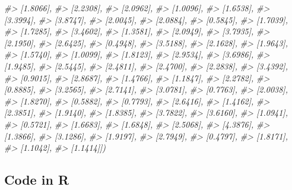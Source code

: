 \documentclass[]{book}
\newenvironment{Shaded}{\begin{snugshade}}{\end{snugshade}}
\newcommand{\CommentTok}[1]{\textcolor[rgb]{0.56,0.35,0.01}{\textit{#1}}}
\begin{document}
\begin{Shaded}
\begin{Highlighting}[]
\CommentTok{#>         [1.8066],}
\CommentTok{#>         [2.2308],}
\CommentTok{#>         [2.0962],}
\CommentTok{#>         [1.0096],}
\CommentTok{#>         [1.6538],}
\CommentTok{#>         [3.3994],}
\CommentTok{#>         [3.8747],}
\CommentTok{#>         [2.0045],}
\CommentTok{#>         [2.0884],}
\CommentTok{#>         [0.5845],}
\CommentTok{#>         [1.7039],}
\CommentTok{#>         [1.7285],}
\CommentTok{#>         [3.4602],}
\CommentTok{#>         [1.3581],}
\CommentTok{#>         [2.0949],}
\CommentTok{#>         [3.7935],}
\CommentTok{#>         [2.1950],}
\CommentTok{#>         [2.6425],}
\CommentTok{#>         [0.4948],}
\CommentTok{#>         [3.5188],}
\CommentTok{#>         [2.1628],}
\CommentTok{#>         [1.9643],}
\CommentTok{#>         [1.5740],}
\CommentTok{#>         [1.0099],}
\CommentTok{#>         [1.8123],}
\CommentTok{#>         [2.9534],}
\CommentTok{#>         [3.6986],}
\CommentTok{#>         [1.9485],}
\CommentTok{#>         [2.5445],}
\CommentTok{#>         [2.4811],}
\CommentTok{#>         [2.4700],}
\CommentTok{#>         [2.2838],}
\CommentTok{#>         [3.4392],}
\CommentTok{#>         [0.9015],}
\CommentTok{#>         [2.8687],}
\CommentTok{#>         [1.4766],}
\CommentTok{#>         [1.1847],}
\CommentTok{#>         [2.2782],}
\CommentTok{#>         [0.8885],}
\CommentTok{#>         [3.2565],}
\CommentTok{#>         [2.7141],}
\CommentTok{#>         [3.0781],}
\CommentTok{#>         [0.7763],}
\CommentTok{#>         [2.0038],}
\CommentTok{#>         [1.8270],}
\CommentTok{#>         [0.5882],}
\CommentTok{#>         [0.7793],}
\CommentTok{#>         [2.6416],}
\CommentTok{#>         [1.4162],}
\CommentTok{#>         [2.3851],}
\CommentTok{#>         [1.9140],}
\CommentTok{#>         [1.8385],}
\CommentTok{#>         [3.7822],}
\CommentTok{#>         [3.6160],}
\CommentTok{#>         [1.0941],}
\CommentTok{#>         [0.5721],}
\CommentTok{#>         [1.6683],}
\CommentTok{#>         [1.6848],}
\CommentTok{#>         [2.5068],}
\CommentTok{#>         [4.3876],}
\CommentTok{#>         [1.3866],}
\CommentTok{#>         [3.1286],}
\CommentTok{#>         [1.9197],}
\CommentTok{#>         [2.7949],}
\CommentTok{#>         [0.4797],}
\CommentTok{#>         [1.8171],}
\CommentTok{#>         [1.1042],}
\CommentTok{#>         [1.1414]])}
\end{Highlighting}
\end{Shaded}

\hypertarget{code-in-r-2}{%
\subsection{Code in R}\label{code-in-r-2}}
\end{document}
